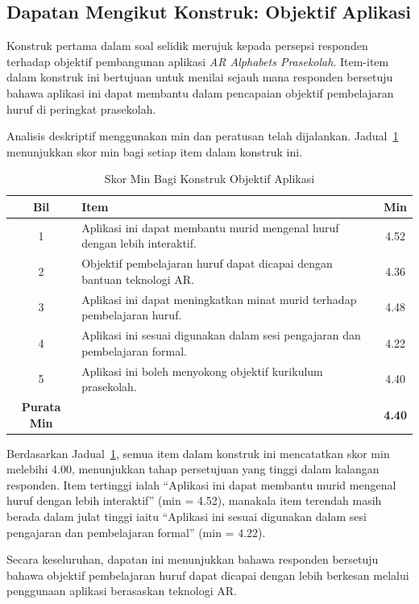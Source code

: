 {\subsection{Dapatan Mengikut Konstruk: Objektif Aplikasi}

Konstruk pertama dalam soal selidik merujuk kepada persepsi responden terhadap objektif pembangunan aplikasi \textit{AR Alphabets Prasekolah}. Item-item dalam konstruk ini bertujuan untuk menilai sejauh mana responden bersetuju bahawa aplikasi ini dapat membantu dalam pencapaian objektif pembelajaran huruf di peringkat prasekolah.

Analisis deskriptif menggunakan min dan peratusan telah dijalankan. Jadual~\ref{jadual:objektifAplikasi} menunjukkan skor min bagi setiap item dalam konstruk ini.

\begin{table}[H]
\centering
\caption{Skor Min Bagi Konstruk Objektif Aplikasi}
\label{jadual:objektifAplikasi}
\begin{tabular}{|c|p{9cm}|c|}
\hline
\textbf{Bil} & \textbf{Item} & \textbf{Min} \\
\hline
1 & Aplikasi ini dapat membantu murid mengenal huruf dengan lebih interaktif. & 4.52 \\
\hline
2 & Objektif pembelajaran huruf dapat dicapai dengan bantuan teknologi AR. & 4.36 \\
\hline
3 & Aplikasi ini dapat meningkatkan minat murid terhadap pembelajaran huruf. & 4.48 \\
\hline
4 & Aplikasi ini sesuai digunakan dalam sesi pengajaran dan pembelajaran formal. & 4.22 \\
\hline
5 & Aplikasi ini boleh menyokong objektif kurikulum prasekolah. & 4.40 \\
\hline
\textbf{Purata Min} & & \textbf{4.40} \\
\hline
\end{tabular}
\end{table}

Berdasarkan Jadual~\ref{jadual:objektifAplikasi}, semua item dalam konstruk ini mencatatkan skor min melebihi 4.00, menunjukkan tahap persetujuan yang tinggi dalam kalangan responden. Item tertinggi ialah “Aplikasi ini dapat membantu murid mengenal huruf dengan lebih interaktif” (min = 4.52), manakala item terendah masih berada dalam julat tinggi iaitu “Aplikasi ini sesuai digunakan dalam sesi pengajaran dan pembelajaran formal” (min = 4.22).

Secara keseluruhan, dapatan ini menunjukkan bahawa responden bersetuju bahawa objektif pembelajaran huruf dapat dicapai dengan lebih berkesan melalui penggunaan aplikasi berasaskan teknologi AR.
}
